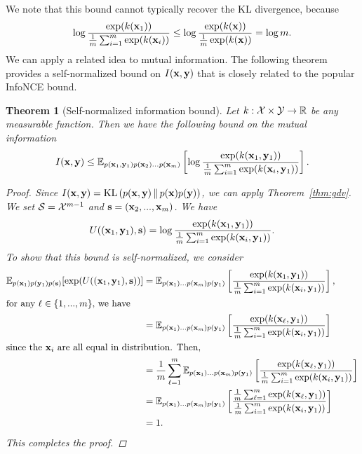 \documentclass[a4paper, 10pt]{report}
\theoremstyle{plain}
\newtheorem{theorem}{Theorem}[chapter]
\begin{document}
	We note that this bound cannot typically recover the KL divergence, because
	\begin{align}
	\log \frac{\exp (k({\mathbf{x}}_1))}{\frac{1}{m}\sum_{i=1}^m \exp (k({\mathbf{x}}_i))} \le \log \frac{\exp (k({\mathbf{x}}))}{\frac{1}{m}\exp (k({\mathbf{x}})) } = \log m.
	\end{align}
	We can apply a related idea to mutual information. The following theorem provides a self-normalized bound on $I({\mathbf{x}},{\mathbf{y}})$ that is closely related to the popular InfoNCE \citep{oord2018representation} bound.
	\begin{theorem}[Self-normalized information bound]
		\label{thm:isn}
		Let $k:{\mathcal{X}}\times{\mathcal{Y}}\to\mathbb{R}$ be any measurable function. Then we have the following bound on the mutual information
		\begin{equation}
		I({\mathbf{x}},{\mathbf{y}}) \le \mathbb{E}_{p({\mathbf{x}}_1,{\mathbf{y}}_1)p({\mathbf{x}}_{2})\dots p({\mathbf{x}}_m)}\left[ \log \frac{\exp (k({\mathbf{x}}_1,{\mathbf{y}}_1))}{\frac{1}{m} \sum_{i=1}^m  \exp (k({\mathbf{x}}_i,{\mathbf{y}}_1)) }\right].
		\end{equation}
		\begin{proof}
			Since $I({\mathbf{x}},{\mathbf{y}}) = \mathrm{KL}\left(p({\mathbf{x}},{\mathbf{y}})\,\|\,p({\mathbf{x}})p({\mathbf{y}})\right)$, we can apply Theorem~\ref{thm:gdv}. 
			We set ${\mathcal{S}}={\mathcal{X}}^{m-1}$ and ${\mathbf{s}}=({\mathbf{x}}_2,...,{\mathbf{x}}_m)$.
			We have
			\begin{equation}
			U(({\mathbf{x}}_1,{\mathbf{y}}_1),{\mathbf{s}}) = \log \frac{\exp (k({\mathbf{x}}_1,{\mathbf{y}}_1))}{\frac{1}{m} \sum_{i=1}^m  \exp (k({\mathbf{x}}_i,{\mathbf{y}}_1)) }.
			\end{equation}
			To show that this bound is self-normalized, we consider
			\begin{align}
			\mathbb{E}_{p({\mathbf{x}}_1)p({\mathbf{y}}_1)p({\mathbf{s}})}[\exp(U(({\mathbf{x}}_1,{\mathbf{y}}_1),{\mathbf{s}}))] &= \mathbb{E}_{p({\mathbf{x}}_{1})\dots p({\mathbf{x}}_m)p({\mathbf{y}}_{1})}\left[ \frac{\exp (k({\mathbf{x}}_1,{\mathbf{y}}_1))}{\frac{1}{m} \sum_{i=1}^m  \exp (k({\mathbf{x}}_i,{\mathbf{y}}_1))}  \right], \\
			\intertext{for any $\ell\in\{1,...,m\}$, we have}
			&= \mathbb{E}_{p({\mathbf{x}}_{1})\dots p({\mathbf{x}}_m)p({\mathbf{y}}_{1})}\left[ \frac{\exp (k({\mathbf{x}}_\ell,{\mathbf{y}}_1))}{\frac{1}{m} \sum_{i=1}^m  \exp (k({\mathbf{x}}_i,{\mathbf{y}}_1))}  \right] \\
			\intertext{since the ${\mathbf{x}}_i$ are all equal in distribution. Then,}
			&= \frac{1}{m}\sum_{\ell=1}^m  \mathbb{E}_{p({\mathbf{x}}_{1})\dots p({\mathbf{x}}_m)p({\mathbf{y}}_{1})}\left[ \frac{\exp (k({\mathbf{x}}_\ell,{\mathbf{y}}_1))}{\frac{1}{m} \sum_{i=1}^m  \exp (k({\mathbf{x}}_i,{\mathbf{y}}_1))}  \right] \\
			&=  \mathbb{E}_{p({\mathbf{x}}_{1})\dots p({\mathbf{x}}_m)p({\mathbf{y}}_{1})}\left[ \frac{\frac{1}{m}\sum_{\ell=1}^m  \exp (k({\mathbf{x}}_\ell,{\mathbf{y}}_1))}{\frac{1}{m} \sum_{i=1}^m  \exp (k({\mathbf{x}}_i,{\mathbf{y}}_1))}  \right] \\
			&=1.
			\end{align}
			This completes the proof.
		\end{proof}
	\end{theorem}
\end{document}
